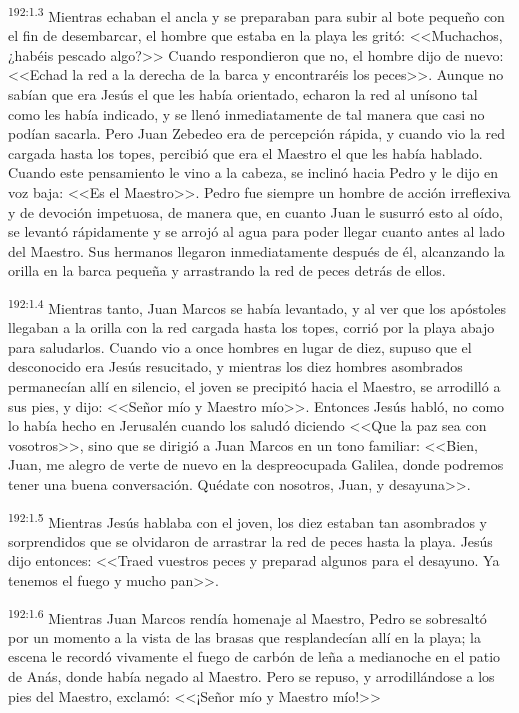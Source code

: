 \par 
\textsuperscript{192:1.3} Mientras echaban el ancla y se preparaban para subir al bote pequeño con el fin de desembarcar, el hombre que estaba en la playa les gritó: <<Muchachos, ¿habéis pescado algo?>> Cuando respondieron que no, el hombre dijo de nuevo: <<Echad la red a la derecha de la barca y encontraréis los peces>>. Aunque no sabían que era Jesús el que les había orientado, echaron la red al unísono tal como les había indicado, y se llenó inmediatamente de tal manera que casi no podían sacarla. Pero Juan Zebedeo era de percepción rápida, y cuando vio la red cargada hasta los topes, percibió que era el Maestro el que les había hablado. Cuando este pensamiento le vino a la cabeza, se inclinó hacia Pedro y le dijo en voz baja: <<Es el Maestro>>. Pedro fue siempre un hombre de acción irreflexiva y de devoción impetuosa, de manera que, en cuanto Juan le susurró esto al oído, se levantó rápidamente y se arrojó al agua para poder llegar cuanto antes al lado del Maestro. Sus hermanos llegaron inmediatamente después de él, alcanzando la orilla en la barca pequeña y arrastrando la red de peces detrás de ellos.

\par 
\textsuperscript{192:1.4} Mientras tanto, Juan Marcos se había levantado, y al ver que los apóstoles llegaban a la orilla con la red cargada hasta los topes, corrió por la playa abajo para saludarlos. Cuando vio a once hombres en lugar de diez, supuso que el desconocido era Jesús resucitado, y mientras los diez hombres asombrados permanecían allí en silencio, el joven se precipitó hacia el Maestro, se arrodilló a sus pies, y dijo: <<Señor mío y Maestro mío>>. Entonces Jesús habló, no como lo había hecho en Jerusalén cuando los saludó diciendo <<Que la paz sea con vosotros>>, sino que se dirigió a Juan Marcos en un tono familiar: <<Bien, Juan, me alegro de verte de nuevo en la despreocupada Galilea, donde podremos tener una buena conversación. Quédate con nosotros, Juan, y desayuna>>.

\par 
\textsuperscript{192:1.5} Mientras Jesús hablaba con el joven, los diez estaban tan asombrados y sorprendidos que se olvidaron de arrastrar la red de peces hasta la playa. Jesús dijo entonces: <<Traed vuestros peces y preparad algunos para el desayuno. Ya tenemos el fuego y mucho pan>>.

\par 
\textsuperscript{192:1.6} Mientras Juan Marcos rendía homenaje al Maestro, Pedro se sobresaltó por un momento a la vista de las brasas que resplandecían allí en la playa; la escena le recordó vivamente el fuego de carbón de leña a medianoche en el patio de Anás, donde había negado al Maestro. Pero se repuso, y arrodillándose a los pies del Maestro, exclamó: <<¡Señor mío y Maestro mío!>>

